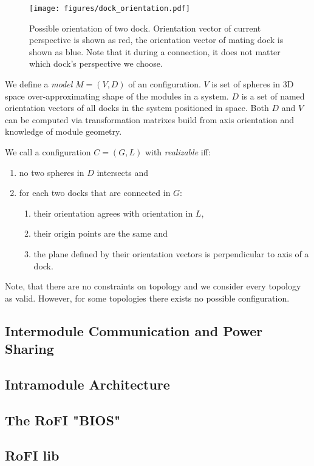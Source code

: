 \begin{figure}
    \centering
    \texttt{[image: figures/dock\_orientation.pdf]}
    \caption{Possible orientation of two dock. Orientation vector of current
    perspective is shown as red, the orientation vector of mating dock is shown
    as blue. Note that it during a connection, it does not matter which dock's
    perspective we choose.}
    \label{fig:dock_orientation}
\end{figure}

We define a \emph{model} $M = (V, D)$ of an configuration. $V$ is set of spheres
in 3D space over-approximating shape of the modules in a system. $D$ is a set of
named orientation vectors of all docks in the system positioned in space. Both
$D$ and $V$ can be computed via transformation matrixes build from axis
orientation and knowledge of module geometry.

We call a configuration $C = (G, L)$ with \emph{realizable} iff:
\begin{enumerate}
    \item no two spheres in $D$ intersects and
    \item for each two docks that are connected in $G$:
        \begin{enumerate}
            \item their orientation agrees with orientation in $L$,
            \item their origin points are the same and
            \item the plane defined by their orientation vectors is perpendicular to axis of a dock.
        \end{enumerate}
\end{enumerate}
Note, that there are no constraints on topology and we consider every topology
as valid. However, for some topologies there exists no possible configuration.

\subsection{Intermodule Communication and Power Sharing}

\subsection{Intramodule Architecture}

\subsection{The RoFI "BIOS" }

\subsection{RoFI lib}


